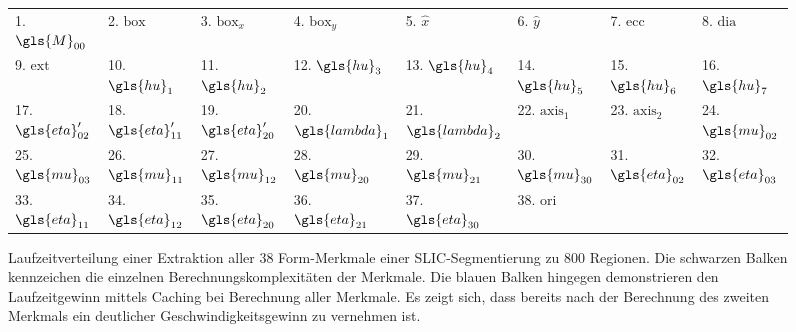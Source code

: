 \begin{figure}[t]
\begin{tikzpicture}[scale=0.33]
\end{tikzpicture}
\begin{tabular}{llllllll}
  \toprule
  1. $\gls{M}_{00}$ & 2. $\mathrm{box}$ & 3. $\mathrm{box}_x$ & 4. $\mathrm{box}_y$ & 5. $\hat{x}$ & 6. $\hat{y}$ & 7. $\mathrm{ecc}$ & 8. $\mathrm{dia}$\\
  9. $\mathrm{ext}$ & 10. $\gls{hu}_1$ & 11. $\gls{hu}_{2}$ & 12. $\gls{hu}_{3}$ & 13. $\gls{hu}_{4}$ & 14. $\gls{hu}_{5}$ & 15. $\gls{hu}_{6}$ & 16. $\gls{hu}_{7}$\\
  17. $\gls{eta}^{\prime}_{02}$ & 18. $\gls{eta}^{\prime}_{11}$ & 19. $\gls{eta}^{\prime}_{20}$ & 20. $\gls{lambda}_1$ & 21. $\gls{lambda}_2$ & 22. $\mathrm{axis}_1$ & 23. $\mathrm{axis}_2$ & 24. $\gls{mu}_{02}$\\
  25. $\gls{mu}_{03}$ & 26. $\gls{mu}_{11}$ & 27. $\gls{mu}_{12}$ & 28. $\gls{mu}_{20}$ & 29. $\gls{mu}_{21}$ & 30. $\gls{mu}_{30}$ & 31. $\gls{eta}_{02}$ & 32. $\gls{eta}_{03}$\\
  33. $\gls{eta}_{11}$ & 34. $\gls{eta}_{12}$ & 35. $\gls{eta}_{20}$ & 36. $\gls{eta}_{21}$ & 37. $\gls{eta}_{30}$ & 38. $\mathrm{ori}$ & & \\
  \bottomrule
\end{tabular}

\caption[Laufzeitverteilung einer Merkmalsextraktion]{Laufzeitverteilung einer Extraktion aller $38$ Form-Merkmale einer \gls{SLIC}-Segmentierung zu $800$ Regionen.
Die schwarzen Balken kennzeichen die einzelnen Berechnungskomplexitäten der Merkmale.
Die blauen Balken hingegen demonstrieren den Laufzeitgewinn mittels Caching bei Berechnung aller Merkmale.
Es zeigt sich, dass bereits nach der Berechnung des zweiten Merkmals ein deutlicher Geschwindigkeitsgewinn zu vernehmen ist.}
\label{fig:merkmals_caching}
\end{figure}
